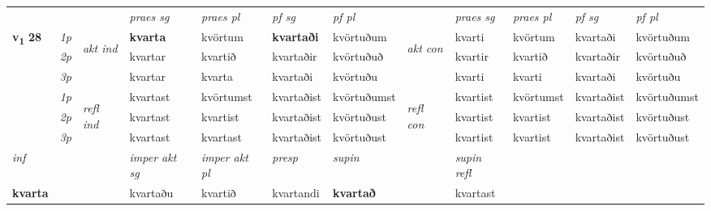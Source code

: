 \begin{longtable}[l]{X>{\footnotesize\itshape}llXXXXlXXXX}
\midrule

 & &   & \textit{praes sg}  & \textit{praes pl}    & \textit{ pf sg} & \textit{pf pl} & & \textit{praes sg}  & \textit{praes pl}    & \textit{pf sg} & \textit{pf pl }  \\ \cmidrule{4-7} \cmidrule{9-12}
 \multirow{2}{*}{{{\textbf{v{\textsubscript{1}}} \Large{\textbf{28}}}}}  & 1p & \multirow{3}{*}{\begin{turn}{90}\textit{akt ind}\end{turn}} & \textbf{kvarta} & kvörtum & \textbf{kvartaði} & kvörtuðum & \multirow{3}{*}{\begin{turn}{90}\textit{akt con}\end{turn}} &kvarti & kvörtum & kvartaði & kvörtuðum\\*
 & 2p &  &  kvartar  & kvartið & kvartaðir & kvörtuðuð & & kvartir & kvartið & kvartaðir & kvörtuðuð \\*
 & 3p &  & kvartar & kvarta & kvartaði & kvörtuðu & & kvarti & kvarti& kvartaði & kvörtuðu \\*
\cmidrule{4-7} \cmidrule{9-12}
 & 1p & \multirow{3}{*}{\begin{turn}{90}\textit{refl ind}\end{turn}}  & kvartast & kvörtumst & kvartaðist & kvörtuðumst & \multirow{3}{*}{\begin{turn}{90}\textit{refl con}\end{turn}}  &kvartist & kvörtumst & kvartaðist & kvörtuðumst \\*
 & 2p &  & kvartast & kvartist & kvartaðist & kvörtuðust & &kvartist & kvartist & kvartaðist & kvörtuðust \\*
 & 3p  & & kvartast & kvartast & kvartaðist & kvörtuðust & & kvartist & kvartist& kvartaðist & kvörtuðust \\*
\cmidrule{4-7} \cmidrule{9-12}

   {\textit{inf}} & &  & \textit{imper akt sg} & \textit{imper akt pl}   & \textit{presp} & \textit{supin} && \textit{supin refl}  \\*
  {\textbf{kvarta}} & && kvartaðu  & kvartið   & kvartandi &  \textbf{kvartað} && kvartast  \\*


\end{longtable}
